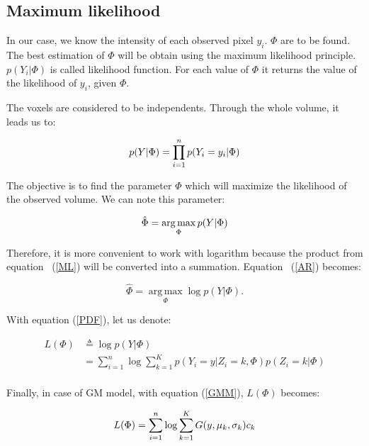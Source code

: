 \subsection{Maximum likelihood}
In our case, we know the intensity of each observed pixel $y_i$. $\Phi$ are to be found. The best estimation of $\Phi$ will be obtain using the maximum likelihood principle. $p(Y_i|\Phi)$ is called likelihood function. For each value of $\Phi$ it returns the value of the likelihood of $y_i$, given $\Phi$.
\par
The voxels are considered to be independents. Through the whole volume, it leads us to:
 
  \begin{equation}\label{ML}
  p(Y|\Phi)= \prod_{i=1}^n p(Y_i=y_i|\Phi)\\
  \end{equation}

\par
The objective is to find the parameter $\Phi$ which will maximize the likelihood of the observed volume. We can note this parameter:
  
  \begin{equation}\label{AR}
  \hat{\Phi}=\operatorname*{arg\,max}_\Phi p(Y|\Phi)\\
  \end{equation}

\par
Therefore, it is more convenient to work with logarithm because the product from equation ~(\ref{ML}) will be converted into a summation. Equation ~(\ref{AR}) becomes:
  
  \begin{equation*}\label{ARL}
  \hat{\Phi}=\operatorname*{arg\,max}_\Phi \operatorname*{log} p(Y|\Phi). %
  \end{equation*}
  
With equation (\ref{PDF}), let us denote:

  \begin{align*}
  L(\Phi) &\triangleq \operatorname*{log} p(Y|\Phi) \\
          &= \sum_{i=1}^n \operatorname*{log}\sum_{k=1}^K p(Y_i=y|Z_i=k,\Phi)p(Z_i=k|\Phi)\\
  \end{align*} 

Finally, in case of GM model, with equation (\ref{GMM}), $L(\Phi)$ becomes:
  
  \begin{equation*}\label{LP}
  L(\Phi)=\sum_{i=1}^n \operatorname*{log} \sum_{k=1}^K G(y,\mu_k,\sigma_k)c_k\\
  \end{equation*}

